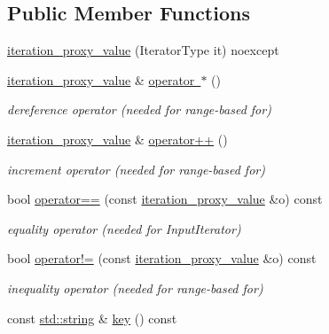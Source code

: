 \subsection*{Public Member Functions}
\begin{DoxyCompactItemize}
\item 
\mbox{\hyperlink{classnlohmann_1_1detail_1_1iteration__proxy__value_a459dd8961b80b2089d8161c9aa466581}{iteration\+\_\+proxy\+\_\+value}} (Iterator\+Type it) noexcept
\item 
\mbox{\hyperlink{classnlohmann_1_1detail_1_1iteration__proxy__value}{iteration\+\_\+proxy\+\_\+value}} \& \mbox{\hyperlink{classnlohmann_1_1detail_1_1iteration__proxy__value_a41384b6e643e8388e4c849b6b8f1312a}{operator $\ast$}} ()
\begin{DoxyCompactList}\small\item\em dereference operator (needed for range-\/based for) \end{DoxyCompactList}\item 
\mbox{\hyperlink{classnlohmann_1_1detail_1_1iteration__proxy__value}{iteration\+\_\+proxy\+\_\+value}} \& \mbox{\hyperlink{classnlohmann_1_1detail_1_1iteration__proxy__value_adf4db2aef31822f3a179435158a4de11}{operator++}} ()
\begin{DoxyCompactList}\small\item\em increment operator (needed for range-\/based for) \end{DoxyCompactList}\item 
bool \mbox{\hyperlink{classnlohmann_1_1detail_1_1iteration__proxy__value_af2b78a8b9c9276b07c928b21bb1e2d54}{operator==}} (const \mbox{\hyperlink{classnlohmann_1_1detail_1_1iteration__proxy__value}{iteration\+\_\+proxy\+\_\+value}} \&o) const
\begin{DoxyCompactList}\small\item\em equality operator (needed for Input\+Iterator) \end{DoxyCompactList}\item 
bool \mbox{\hyperlink{classnlohmann_1_1detail_1_1iteration__proxy__value_a646dbb2b1842f44f42ee1e14245b8595}{operator!=}} (const \mbox{\hyperlink{classnlohmann_1_1detail_1_1iteration__proxy__value}{iteration\+\_\+proxy\+\_\+value}} \&o) const
\begin{DoxyCompactList}\small\item\em inequality operator (needed for range-\/based for) \end{DoxyCompactList}\item 
const \mbox{\hyperlink{namespacenlohmann_1_1detail_a1ed8fc6239da25abcaf681d30ace4985ab45cffe084dd3d20d928bee85e7b0f21}{std\+::string}} \& \mbox{\hyperlink{classnlohmann_1_1detail_1_1iteration__proxy__value_a614278e2eecdf088199fac275ce114b6}{key}} () const

\end{DoxyCompactItemize}
